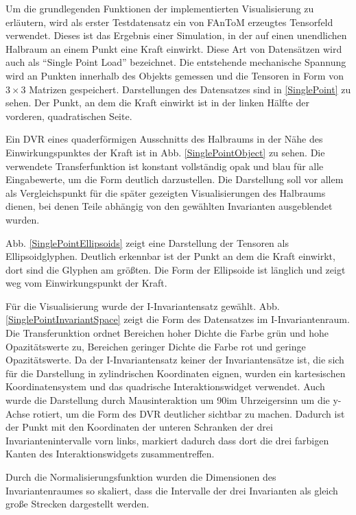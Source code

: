 \documentclass[a4paper,fontsize=12pt,toc=bib,halfparskip]{scrartcl}
\begin{document}
Um die grundlegenden Funktionen der implementierten Visualisierung zu erl\"autern, wird als erster Testdatensatz ein von FAnToM erzeugtes Tensorfeld verwendet. Dieses ist das Ergebnis einer Simulation, in der auf einen unendlichen Halbraum an einem Punkt eine Kraft einwirkt. Diese Art von Datens\"atzen wird auch als ``Single Point Load'' bezeichnet. Die entstehende mechanische Spannung wird an Punkten innerhalb des Objekts gemessen und die Tensoren in Form von $3\times3$ Matrizen gespeichert. Darstellungen des Datensatzes sind in \ref{SinglePoint} zu sehen. Der Punkt, an dem die Kraft einwirkt ist in der linken H\"alfte der vorderen, quadratischen Seite. 

Ein DVR eines quaderf\"ormigen Ausschnitts des Halbraums in der N\"ahe des Einwirkungspunktes der Kraft ist in Abb. \ref{SinglePointObject} zu sehen. Die verwendete Transferfunktion ist konstant vollst\"andig opak und blau f\"ur alle Eingabewerte, um die Form deutlich darzustellen. Die Darstellung soll vor allem als Vergleichspunkt f\"ur die sp\"ater gezeigten Visualisierungen des Halbraums dienen, bei denen Teile abh\"angig von den gew\"ahlten Invarianten ausgeblendet wurden.

Abb. \ref{SinglePointEllipsoids} zeigt eine Darstellung der Tensoren als Ellipsoidglyphen. Deutlich erkennbar ist der Punkt an dem die Kraft einwirkt, dort sind die Glyphen am gr\"o{\ss}ten. Die Form der Ellipsoide ist l\"anglich und zeigt weg vom Einwirkungspunkt der Kraft.

F\"ur die Visualisierung wurde der I-Invariantensatz gew\"ahlt. Abb. \ref{SinglePointInvariantSpace} zeigt die Form des Datensatzes im I-Invariantenraum. Die Transferunktion ordnet Bereichen hoher Dichte die Farbe gr\"un und hohe Opazit\"atswerte zu, Bereichen geringer Dichte die Farbe rot und geringe Opazit\"atswerte. Da der I-Invariantensatz keiner der Invariantens\"atze ist, die sich f\"ur die Darstellung in zylindrischen Koordinaten eignen, wurden ein kartesischen Koordinatensystem und das quadrische Interaktionswidget verwendet. Auch wurde die Darstellung durch Mausinteraktion um 90\textdegree im Uhrzeigersinn um die y-Achse rotiert, um die Form des DVR deutlicher sichtbar zu machen. Dadurch ist der Punkt mit den Koordinaten der unteren Schranken der drei Invariantenintervalle vorn links, markiert dadurch dass dort die drei farbigen Kanten des Interaktionswidgets zusammentreffen.

Durch die Normalisierungsfunktion wurden die Dimensionen des Invariantenraumes so skaliert, dass die Intervalle der drei Invarianten als gleich gro{\ss}e Strecken dargestellt werden.
\end{document}
